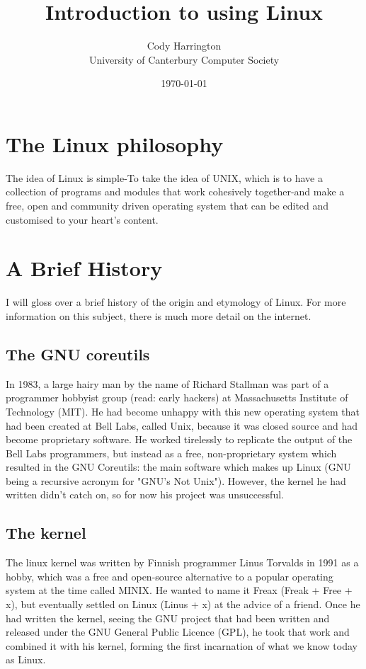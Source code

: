 \documentclass{article}
\begin{document}
\title{Introduction to using Linux}
\author{Cody Harrington\\University of Canterbury Computer Society}
\date{\today}
\maketitle

\section{The Linux philosophy}
The idea of Linux is simple-To take the idea of UNIX, which is to have a collection of programs and modules that work cohesively together-and make a free, open and community driven operating system that can be edited and customised to your heart's content.

\section{A Brief History}

I will gloss over a brief history of the origin and etymology of Linux. For more information on this subject, there is much more detail on the internet.

\subsection{The GNU coreutils}
In 1983, a large hairy man by the name of Richard Stallman was part of a programmer hobbyist group (read: early hackers) at Massachusetts Institute of Technology (MIT). He had become unhappy with this new operating system that had been created at Bell Labs, called Unix, because it was closed source and had become proprietary software. He worked tirelessly to replicate the output of the Bell Labs programmers, but instead as a free, non-proprietary system which resulted in the GNU Coreutils: the main software which makes up Linux (GNU being a recursive acronym for "GNU's Not Unix"). However, the kernel he had written didn't catch on, so for now his project was unsuccessful.

\subsection{The kernel}
The linux kernel was written by Finnish programmer Linus Torvalds in 1991 as a hobby, which was a free and open-source alternative to a popular operating system at the time called MINIX. He wanted to name it Freax (Freak + Free + x), but eventually settled on Linux (Linus + x) at the advice of a friend. Once he had written the kernel, seeing the GNU project that had been written and released under the GNU General Public Licence (GPL), he took that work and combined it with his kernel, forming the first incarnation of what we know today as Linux.
\end{document}
